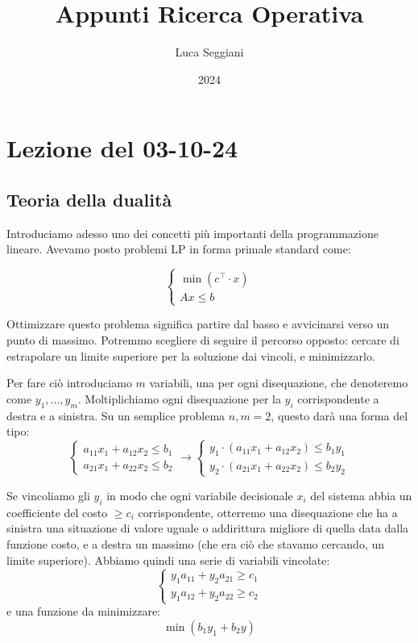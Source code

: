 \documentclass[a4paper,11pt]{article}
\title{Appunti Ricerca Operativa}
\author{Luca Seggiani}
\date{2024}
\begin{document}
\section{Lezione del 03-10-24}

\thispagestyle{empty}
\pagestyle{fancy}

\subsection{Teoria della dualità}
Introduciamo adesso uno dei concetti più importanti della programmazione lineare.
Avevamo posto problemi LP in forma primale standard come:

\[
	\begin{cases}
		\min(c^\intercal \cdot x) \\
		Ax \leq b
	\end{cases}
\]

Ottimizzare questo problema significa partire dal basso e avvicinarsi verso un punto di massimo.
Potremmo scegliere di seguire il percorso opposto: cercare di estrapolare un limite superiore per la soluzione dai vincoli, e minimizzarlo.

Per fare ciò introduciamo $m$ variabili, una per ogni disequazione, che denoteremo come $y_1, ..., y_m$.
Moltiplichiamo ogni disequazione per la $y_i$ corrispondente a destra e a sinistra.
Su un semplice problema $n, m = 2$, questo darà una forma del tipo:
\[
	\begin{cases}
		a_{11} x_1 + a_{12} x_2 \leq b_1 \\
		a_{21} x_1 + a_{22} x_2 \leq b_2
	\end{cases}
	\rightarrow
	\begin{cases}
	y_1 \cdot \left(	a_{11} x_1 + a_{12} x_2 \right) \leq b_1 y_1 \\
	y_2 \cdot \left( a_{21} x_1 + a_{22} x_2 \right) \leq b_2 y_2
	\end{cases}
\]

Se vincoliamo gli $y_i$ in modo che ogni variabile decisionale $x_i$ del sistema abbia un coefficiente del costo $\geq c_i$ corrispondente, otterremo una disequazione che ha a sinistra una situazione di valore uguale o addirittura migliore di quella data dalla funzione costo, e a destra un massimo (che era ciò che stavamo cercando, un limite superiore).
Abbiamo quindi una serie di variabili vincolate:
\[
	\begin{cases}			
		y_1 a_11 + y_2 a_21 \geq c_1 \\ 
		y_1 a_12 + y_2 a_22 \geq c_2 
	\end{cases}
\]
e una funzione da minimizzare:
$$
\min(b_1 y_1 + b_2 y)
$$
\end{document}
